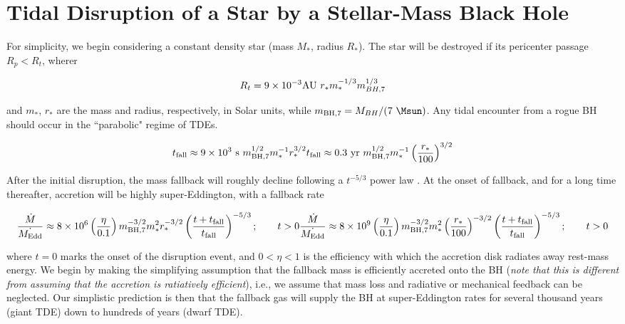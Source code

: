 \section{Tidal Disruption of a Star by a Stellar-Mass Black Hole}\label{section:general}


For simplicity, we begin considering a constant density star (mass $M_*$, radius $R_*$).  The star will be destroyed if its pericenter passage $R_p < R_t$, wherer

\begin{equation}
R_t = 9 \times 10^{-3} {\rm AU}~ r_{*} m_{*}^{-1/3} m_{BH,7}^{1/3}
\end{equation}

and $m_*$, $r_*$ are the mass and radius, respectively, in Solar units, while $m_{{\rm BH},7} = M_{BH}/(7~\Msun)$.  Any tidal encounter from a rogue BH should occur in the ``parabolic" regime of TDEs.   

\begin{equation}
t_{\rm fall} \approx 9 \times 10^3~{\rm s}~m_{{\rm BH},7}^{1/2}m_{*}^{-1}r_{*}^{3/2}\\
t_{\rm fall} \approx 0.3~{\rm yr}~m_{{\rm BH},7}^{1/2}m_{*}^{-1}\left(\frac{r_{*}}{100}\right)^{3/2}
\end{equation}

After the initial disruption, the mass fallback will roughly decline following a $t^{-5/3}$ power law \citep{Rees_1988}. At the onset of fallback, and for a long time thereafter, accretion will be highly super-Eddington, with a fallback rate

\begin{equation}
\frac{\dot{M}}{\dot{M_{\rm Edd}}} \approx 8 \times 10^{6} \left(\frac{\eta}{0.1}\right)m_{\rm BH,7}^{-3/2}m_{*}^{2}r_*^{-3/2} \left(\frac{t+t_{\rm fall}}{t_{\rm fall}}\right)^{-5/3}; \qquad t > 0 \\
\frac{\dot{M}}{\dot{M_{\rm Edd}}} \approx 8 \times 10^{9} \left(\frac{\eta}{0.1}\right)m_{\rm BH,7}^{-3/2}m_{*}^{2}\left(\frac{r_*}{100}\right)^{-3/2} \left(\frac{t+t_{\rm fall}}{t_{\rm fall}}\right)^{-5/3}; \qquad t > 0
\end{equation}

where $t=0$ marks the onset of the disruption event, and $0 < \eta < 1$ is the efficiency with which the accretion disk radiates away rest-mass energy.  We begin by making the simplifying assumption that the fallback mass is efficiently accreted onto the BH ({\em note that this is different from assuming that the accretion is ratiatively efficient}), i.e., we assume that mass loss and radiative or mechanical feedback can be neglected.  Our simplistic prediction is then that the fallback gas will supply the BH at super-Eddington rates for several thousand years (giant TDE) down to hundreds of years (dwarf TDE).   

